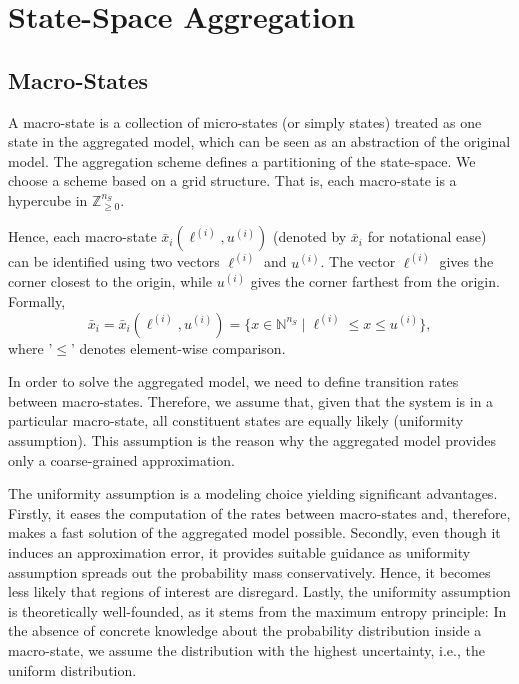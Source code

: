 \chapter{State-Space Aggregation}\label{sec:statagg:aggregation}
\section{Macro-States}
A macro-state is a collection of micro-states (or simply states) treated as one state in the aggregated model, which can be seen as an abstraction of the original model.
The aggregation scheme defines a partitioning of the state-space.
We choose a scheme based on a grid structure. That is, each macro-state is a hypercube in $\mathbb{Z}_{\geq 0}^{n_S}$.

Hence, each macro-state $\bar{x}_i(\ell^{(i)},u^{(i)})$ (denoted by $\bar{x}_i$ for notational ease) can be identified using two vectors $\ell^{(i)}$
and $u^{(i)}$.
The vector $\ell^{(i)}$ gives the corner closest to the origin, while $u^{(i)}$
gives the corner farthest from the origin.
Formally,
\begin{equation}\label{eq:macros_state}
    \bar{x}_i = \bar{x}_i(\ell^{(i)},u^{(i)}) =  \{x\in\mathbb{N}^{n_S} \mid  \ell^{(i)}  \leq x  \leq u^{(i)} \},
\end{equation}
where '$\leq$' denotes element-wise comparison.

In order to solve the aggregated model, we need to define transition rates between macro-states.
Therefore, we assume that, given that the system is in a particular macro-state, all constituent states are equally likely (uniformity assumption).
This assumption is the reason why the aggregated model provides only a coarse-grained approximation. 

The uniformity assumption is a modeling choice yielding significant advantages.
Firstly, it eases the computation of the rates between macro-states and, therefore, makes a fast solution of the aggregated model possible.
Secondly, even though it induces an approximation error, it provides suitable guidance as uniformity assumption spreads out the probability mass conservatively.
Hence, it becomes less likely that regions of interest are disregard.
Lastly, the uniformity assumption is theoretically well-founded, as it stems from the maximum entropy principle: 
In the absence of concrete knowledge about the probability distribution inside a macro-state, we assume the distribution with the highest uncertainty, i.e., the uniform distribution. 


